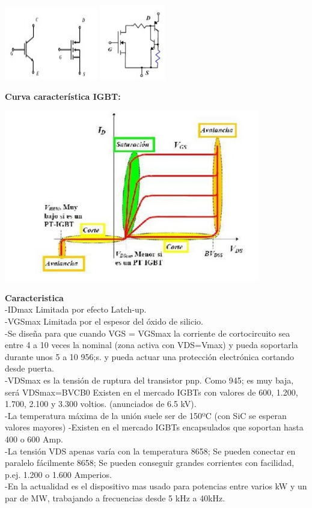 \documentclass[10pt,a4paper]{article}
\begin{document}
\begin{center}
\includegraphics[scale=0.8]{5.png}
\includegraphics[scale=0.8]{6.png}
\end{center} 


\textbf{Curva característica IGBT:}\\

\begin{center}
\includegraphics[scale=0.8]{7.png}
\end{center} 

\textbf{Caracteristica}\\
-IDmax Limitada por efecto Latch-up.\\
-VGSmax Limitada por el espesor del óxido de silicio.\\
-Se diseña para que cuando VGS = VGSmax la corriente de cortocircuito sea entre 4 a 10 veces la nominal (zona activa con VDS=Vmax) y pueda soportarla durante unos 5 a 10 956;s. y pueda actuar una protección electrónica cortando desde puerta.\\
-VDSmax es la tensión de ruptura del transistor pnp. Como 945; es muy baja, será  VDSmax=BVCB0 Existen en el mercado IGBTs con valores de 600, 1.200, 1.700,  2.100 y 3.300 voltios. (anunciados de 6.5 kV).\\
-La temperatura máxima de la unión suele ser de 150ºC (con SiC se esperan  valores mayores)
-Existen en el mercado IGBTs encapsulados que soportan hasta 400 o 600 Amp.\\
-La tensión VDS apenas varía con la temperatura 8658; Se pueden conectar en  paralelo fácilmente 8658; Se pueden conseguir grandes corrientes con facilidad,  p.ej. 1.200 o 1.600 Amperios.\\
-En la actualidad es el dispositivo mas usado para potencias entre varios kW y un  par de MW, trabajando a frecuencias desde 5 kHz a 40kHz.\\
\end{document}
